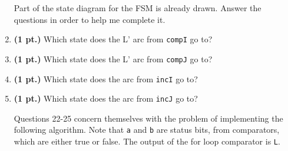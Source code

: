 \documentclass{article}
\begin{document}
\begin{enumerate}
Part of the state diagram for the FSM is already drawn.  Answer the
questions in order to help me complete it.

\item{\bf(1 pt.)} Which state does the L' arc from \verb+compI+ go to?

\item{\bf(1 pt.)} Which state does the L' arc from \verb+compJ+ go to?


\item{\bf(1 pt.)} Which state does the arc from \verb+incI+ go to?

\item{\bf(1 pt.)} Which state does the arc from \verb+incJ+ go to?

\pagebreak
Questions 22-25 concern themselves with the problem of 
implementing the following algorithm.  Note that \verb+a+
and \verb+b+ are status bits, from comparators, which 
are either true or false.  The output of the for loop
comparator is \verb+L+.


\end{enumerate}
\end{document}
